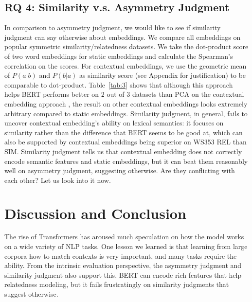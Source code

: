 \documentclass[letterpaper]{article} %
\begin{document}
\subsection{RQ 4: Similarity v.s. Asymmetry Judgment}
In comparison to asymmetry judgment, we would like to see if similarity judgment can say otherwise about embeddings. We compare all embeddings on popular symmetric similarity/relatedness datasets. We take the dot-product score of two word embeddings for static embeddings and calculate the Spearman's correlation on the scores. For contextual embeddings, we use the geometric mean of $P(a|b)$ and $P(b|a)$ as similarity score (see Appendix for justification) to be comparable to dot-product. Table~\ref{tab:3} shows that although this approach helps BERT performs better on 2 out of 3 datasets than PCA on the contextual embedding approach \cite{Ethayarajh2019HowCA}, the result on other contextual embeddings looks extremely arbitrary compared to static embeddings. Similarity judgment, in general, fails to uncover contextual embedding's ability on lexical semantics: it focuses on similarity rather than the difference that BERT seems to be good at, which can also be supported by contextual embeddings being superior on WS353 REL than SIM. 
Similarity judgment tells us that contextual embedding does not correctly encode semantic features and static embeddings, but it can beat them reasonably well on asymmetry judgment, suggesting otherwise. Are they conflicting with each other? Let us look into it now.

\section{Discussion and Conclusion}

The rise of Transformers has aroused much speculation on how the model works on a wide variety of NLP tasks. One lesson we learned is that learning from large corpora how to match contexts is very important, and many tasks require the ability. From the intrinsic evaluation perspective, the asymmetry judgment and similarity judgment also support this. BERT can encode rich features that help relatedness modeling, but it fails frustratingly on similarity judgments that suggest otherwise.
\end{document}
